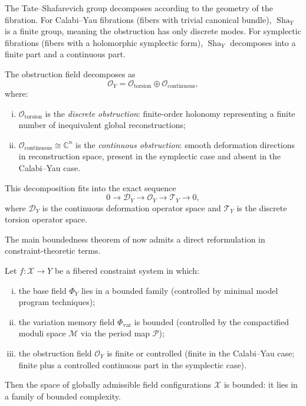 \documentclass[11pt,openany]{book}
\newcommand{\Sha}{\operatorname{Sha}}
\begin{document}
The Tate--Shafarevich group decomposes according to the
geometry of the fibration.  For Calabi--Yau fibrations
(fibers with trivial canonical bundle), $\Sha_Y$ is a
finite group, meaning the obstruction has only discrete
modes.  For symplectic fibrations (fibers with a
holomorphic symplectic form), $\Sha_Y$ decomposes into a
finite part and a continuous part.

\begin{proposition}
\label{prop:obstruction-decomposition}
The obstruction field decomposes as
\[
  \mathcal{O}_Y =
    \mathcal{O}_{\mathrm{torsion}} \oplus
    \mathcal{O}_{\mathrm{continuous}},
\]
where:
\begin{enumerate}[(i)]
  \item $\mathcal{O}_{\mathrm{torsion}}$ is the
    \emph{discrete obstruction}: finite-order holonomy
    representing a finite number of inequivalent global
    reconstructions;
  \item $\mathcal{O}_{\mathrm{continuous}} \cong
    \mathbb{C}^n$ is the \emph{continuous obstruction}:
    smooth deformation directions in reconstruction space,
    present in the symplectic case and absent in the
    Calabi--Yau case.
\end{enumerate}
This decomposition fits into the exact sequence
\[
  0 \to \mathcal{D}_Y \to \mathcal{O}_Y \to
    \mathcal{T}_Y \to 0,
\]
where $\mathcal{D}_Y$ is the continuous deformation
operator space and $\mathcal{T}_Y$ is the discrete torsion
operator space.
\end{proposition}

The main boundedness theorem of \citep{engel2025} now
admits a direct reformulation in constraint-theoretic
terms.

\begin{theorem}
\label{thm:constraint-closure-boundedness}
Let $f : \mathcal{X} \to Y$ be a fibered constraint system
in which:
\begin{enumerate}[(i)]
  \item the base field $\Phi_Y$ lies in a bounded family
    (controlled by minimal model program techniques);
  \item the variation memory field $\Phi_{\mathrm{var}}$
    is bounded (controlled by the compactified moduli
    space $\mathcal{M}$ via the period map
    $\mathcal{P}$);
  \item the obstruction field $\mathcal{O}_Y$ is finite
    or controlled (finite in the Calabi--Yau case; finite
    plus a controlled continuous part in the symplectic
    case).
\end{enumerate}
Then the space of globally admissible field configurations
$\mathcal{X}$ is bounded: it lies in a family of bounded
complexity.
\end{theorem}
\end{document}
